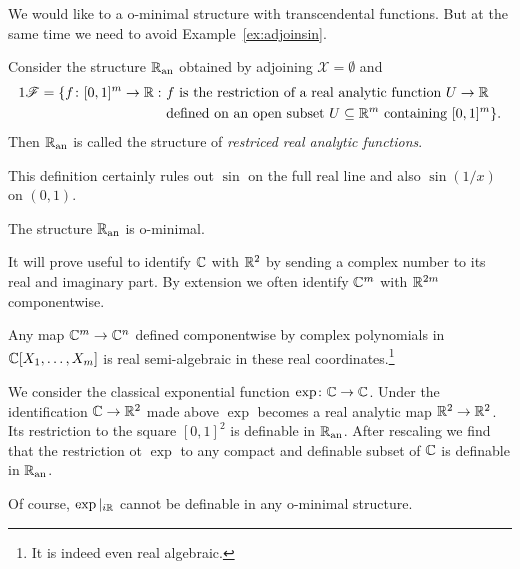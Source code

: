 We would like to a o-minimal structure with transcendental functions.
But at the same time we need to avoid  Example~\ref{ex:adjoinsin}.

\begin{definition}
  Consider the structure ${{\mathbb{R}}_{\mathrm{an}}}$ obtained by adjoining
  $\mathscr{X} = \emptyset$ and
  \begin{alignat*}1
    \mathscr{F} = \{f \colon [0,1]^m\rightarrow\IR:  \,\,&\text{$f$ is the
      restriction of a real analytic function $U\rightarrow \IR$}\\
    &\text{defined on an open subset
      $U\subset\IR^m$ containing $[0,1]^m$}\}.  
  \end{alignat*}
  Then ${{\mathbb{R}}_{\mathrm{an}}}$ is called the structure of \emph{restriced real analytic functions}.
\end{definition}

This definition certainly rules out $\sin$ on the full real line and
also $\sin(1/x)$ on $(0,1)$. 

\begin{theorem}
  The structure ${{\mathbb{R}}_{\mathrm{an}}}$ is o-minimal. 
\end{theorem}

\begin{convention}
  \label{conv:identCCRR2}
  It will prove useful to identify ${\mathbb{C}}$ with ${\mathbb{R}}^2$ by sending a
  complex number to its real and imaginary part. By extension we often
  identify ${\mathbb{C}}^m$ with ${\mathbb{R}}^{2m}$ componentwise.

  Any  map ${\mathbb{C}}^m\rightarrow {\mathbb{C}}^n$ defined componentwise by complex polynomials in
  ${\mathbb{C}}[X_1,\ldots,X_m]$
  is real semi-algebraic in these real coordinates.\footnote{It is
    indeed even real algebraic.}
\end{convention}

\begin{example}
  We consider the classical exponential function
  $\exp\colon{\mathbb{C}}\rightarrow{\mathbb{C}}$.  Under the identification
  ${\mathbb{C}}\rightarrow{\mathbb{R}}^2$ made above
  $\exp$ becomes a real analytic map
  ${\mathbb{R}}^2\rightarrow{\mathbb{R}}^2$.
  Its restriction to the square $[0,1]^2$ is definable in ${{\mathbb{R}}_{\mathrm{an}}}$.
  After rescaling we find that the restriction ot $\exp$ to any
  compact and definable subset of ${\mathbb{C}}$ is definable in ${{\mathbb{R}}_{\mathrm{an}}}$.

  Of course, $\exp|_{i{\mathbb{R}}}$ cannot be definable in any o-minimal
  structure. 
\end{example}

